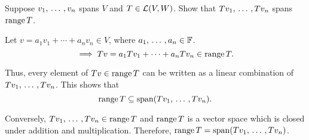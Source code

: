 \begin{xrcs}
  Suppose $v_1, {\, \ldots \,\,}, v_n$ spans $V$ and $T \in \mathcal{L}(V,W)$. Show that $Tv_1, {\, \ldots \,\,}, Tv_n$ spans $\operatorname{range} T$.
\end{xrcs}
\begin{prf}
  Let $v = a_1 v_1 + \cdots + a_n v_n \in V$, where $a_1, {\, \ldots \,\,}, a_n \in \mathbb{F}$.
  \begin{equation}
    \implies Tv = a_1 T v_1 + \cdots + a_n T v_n \in \operatorname{range} T.
  \end{equation}

  Thus, every element of $Tv \in \operatorname{range} T$ can be written as a linear combination of $Tv_1, {\, \ldots \,\,}, Tv_n$. This shows that
  \begin{equation}
    \operatorname{range} T \subseteq \operatorname{span} (T v_1, {\, \ldots \,\,}, T v_n).
  \end{equation}

  Conversely, \( Tv_1, {\, \ldots \,\,}, Tv_n \in \operatorname{range} T \) and $\operatorname{range} T$ is a vector space which is closed under addition and multiplication. Therefore, $\operatorname{range} T = \operatorname{span} (Tv_1, {\, \ldots \,\,}, Tv_n)$.
\end{prf}

